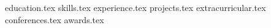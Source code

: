 \documentclass[11pt, a4paper]{awesome-cv}
\newcommand*{\sectiondir}{resume/}
\begin{document}
\makecvheader

\bigskip
{education.tex}
{skills.tex}
{experience.tex}
{projects.tex}
{extracurricular.tex}
{conferences.tex}
{awards.tex}
\end{document}

